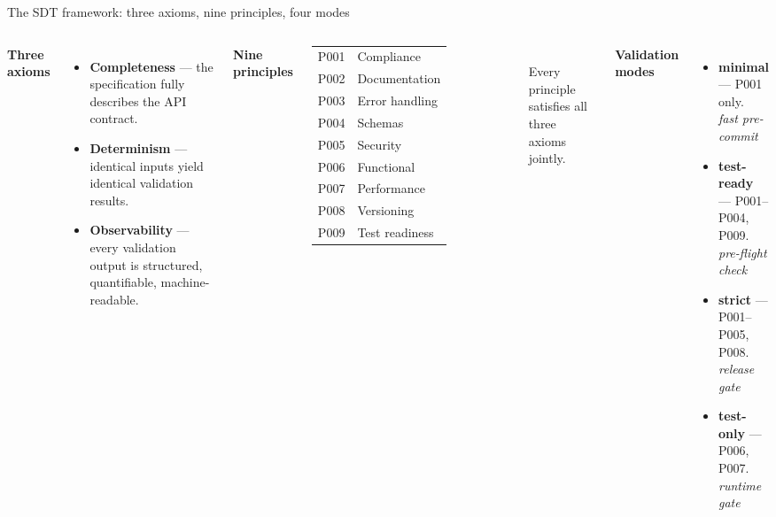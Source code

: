 \documentclass[11pt,aspectratio=169]{beamer}
\begin{document}
\begin{frame}{The SDT framework: three axioms, nine principles, four modes}

\vspace{-0.3em}
\begin{columns}[T,onlytextwidth]

\textbf{\textcolor{sdtblue}{Three axioms}}\\[0.15em]
\footnotesize
\begin{itemize}\setlength\itemsep{0.25em}
\item \textbf{Completeness} --- the specification fully describes
  the API contract.
\item \textbf{Determinism} --- identical inputs yield
  identical validation results.
\item \textbf{Observability} --- every validation output is structured,
  quantifiable, machine-readable.
\end{itemize}

\textbf{\textcolor{sdtblue}{Nine principles}}\\[0.15em]
\scriptsize
\begin{tabular}{@{}ll@{}}
P001 & Compliance \\
P002 & Documentation \\
P003 & Error handling \\
P004 & Schemas \\
P005 & Security \\
P006 & Functional \\
P007 & Performance \\
P008 & Versioning \\
P009 & Test readiness \\
\end{tabular}\\[0.4em]
\tiny Every principle satisfies all three axioms jointly.

\textbf{\textcolor{sdtblue}{Validation modes}}\\[0.15em]
\scriptsize
\begin{itemize}\setlength\itemsep{0.2em}
\item \textbf{minimal} --- P001 only.\\\textit{fast pre-commit}
\item \textbf{test-ready} --- P001--P004, P009.\\\textit{pre-flight check}
\item \textbf{strict} --- P001--P005, P008.\\\textit{release gate}
\item \textbf{test-only} --- P006, P007.\\\textit{runtime gate}
\end{itemize}


\end{columns}
\end{frame}
\end{document}
